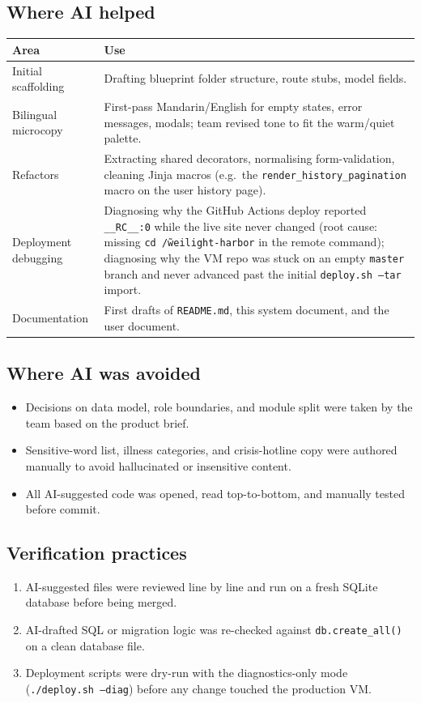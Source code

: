 \subsection{Where AI helped}
\begin{tabularx}{\linewidth}{@{} L{4cm} X @{}}
  \toprule
  \textbf{Area} & \textbf{Use} \\
  \midrule
  Initial scaffolding
    & Drafting blueprint folder structure, route stubs, model fields. \\
  Bilingual microcopy
    & First-pass Mandarin/English for empty states, error messages,
      modals; team revised tone to fit the warm/quiet palette. \\
  Refactors
    & Extracting shared decorators, normalising form-validation,
      cleaning Jinja macros (e.g.\ the \texttt{render\_history\_pagination}
      macro on the user history page). \\
  Deployment debugging
    & Diagnosing why the GitHub Actions deploy reported
      \texttt{\_\_RC\_\_:0} while the live site never changed (root
      cause: missing \texttt{cd \~/weilight-harbor} in the remote
      command); diagnosing why the VM repo was stuck on an empty
      \texttt{master} branch and never advanced past the initial
      \texttt{deploy.sh --tar} import. \\
  Documentation
    & First drafts of \texttt{README.md}, this system document, and
      the user document. \\
  \bottomrule
\end{tabularx}

\subsection{Where AI was avoided}
\begin{itemize}
  \item Decisions on data model, role boundaries, and module split were
        taken by the team based on the product brief.
  \item Sensitive-word list, illness categories, and crisis-hotline copy
        were authored manually to avoid hallucinated or insensitive
        content.
  \item All AI-suggested code was opened, read top-to-bottom, and
        manually tested before commit.
\end{itemize}

\subsection{Verification practices}
\begin{enumerate}
  \item AI-suggested files were reviewed line by line and run on a fresh
        SQLite database before being merged.
  \item AI-drafted SQL or migration logic was re-checked against
        \texttt{db.create\_all()} on a clean database file.
  \item Deployment scripts were dry-run with the diagnostics-only mode
        (\texttt{./deploy.sh --diag}) before any change touched the
        production VM.
\end{enumerate}

